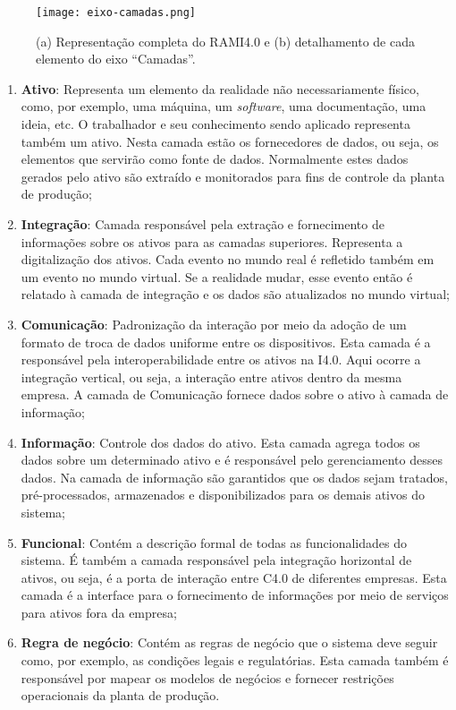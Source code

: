 \begin{figure}[htb]
	\centering
	\texttt{[image: eixo-camadas.png]}
	\caption{(a) Representação completa do RAMI4.0 e (b) detalhamento de cada elemento do eixo ``Camadas''.}
	\label{fig:eixo-camadas}
\end{figure}

\begin{enumerate}
	\item \textbf{Ativo}: Representa um elemento da realidade não necessariamente físico, como, por exemplo, uma máquina, um \textit{software}, uma documentação, uma ideia, etc. O trabalhador e seu conhecimento sendo aplicado representa também um ativo. Nesta camada estão os fornecedores de dados, ou seja, os elementos que servirão como fonte de dados. Normalmente estes dados gerados pelo ativo são extraído e monitorados para fins de controle da planta de produção;

	\item \textbf{Integração}: Camada responsável pela extração e fornecimento de informações sobre os ativos para as camadas superiores. Representa a digitalização dos ativos. Cada evento no mundo real é refletido também em um evento no mundo virtual. Se a realidade mudar, esse evento então é relatado à camada de integração e os dados são atualizados no mundo virtual;

	\item \textbf{Comunicação}: Padronização da interação por meio da adoção de um formato de troca de dados uniforme entre os dispositivos. Esta camada é a responsável pela interoperabilidade entre os ativos na I4.0. Aqui ocorre a integração vertical, ou seja, a interação entre ativos dentro da mesma empresa. A camada de Comunicação fornece dados sobre o ativo à camada de informação;

	\item \textbf{Informação}: Controle dos dados do ativo. Esta camada agrega todos os dados sobre um determinado ativo e é responsável pelo gerenciamento desses dados. Na camada de informação são garantidos que os dados sejam tratados, pré-processados, armazenados e disponibilizados para os demais ativos do sistema;

	\item \textbf{Funcional}: Contém a descrição formal de todas as funcionalidades do sistema. É também a camada responsável pela integração horizontal de ativos, ou seja, é a porta de interação entre C4.0 de diferentes empresas. Esta camada é a interface para o fornecimento de informações por meio de serviços para ativos fora da empresa;

	\item \textbf{Regra de negócio}: Contém as regras de negócio que o sistema deve seguir como, por exemplo, as condições legais e regulatórias. Esta camada também é responsável por mapear os modelos de negócios e fornecer restrições operacionais da planta de produção.
\end{enumerate}

